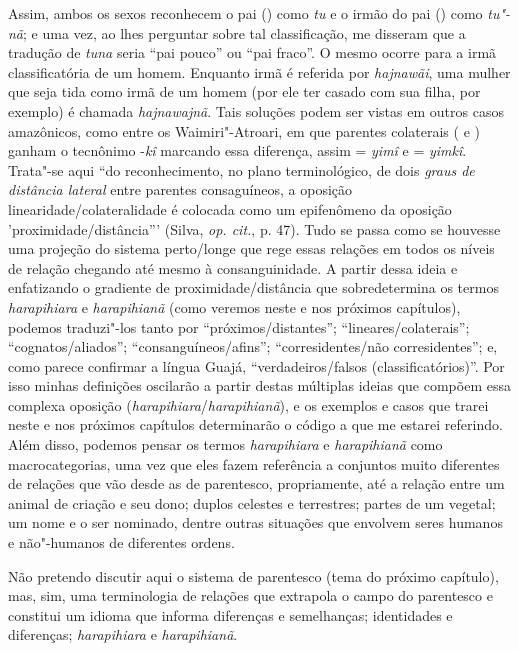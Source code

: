 Assim, ambos os sexos reconhecem o pai () como \emph{tu} e o irmão do
pai () como \emph{tu"-nã}; e uma vez, ao lhes perguntar sobre tal
classificação, me disseram que a tradução de \emph{tuna} seria ``pai
pouco'' ou ``pai fraco''. O mesmo ocorre para a irmã classificatória de um
homem. Enquanto irmã é referida por \emph{hajnawãi}, uma mulher que seja
tida como irmã de um homem (por ele ter casado com sua filha, por
exemplo) é chamada \emph{hajnawajnã}. Tais soluções podem ser vistas em
outros casos amazônicos, como entre os Waimiri"-Atroari, em que parentes
colaterais ( e ) ganham o tecnônimo -\emph{kî} marcando essa
diferença, assim  = \emph{yimî} e  = \emph{yimkî}. Trata"-se aqui ``do
reconhecimento, no plano terminológico, de dois \emph{graus de distância
lateral} entre parentes consaguíneos, a oposição
linearidade/colateralidade é colocada como um epifenômeno da oposição
'proximidade/distância''' (Silva, \emph{op. cit.}, p. 47). Tudo se passa como se
houvesse uma projeção do sistema perto/longe que rege essas relações em
todos os níveis de relação chegando até mesmo à consanguinidade. A
partir dessa ideia e enfatizando o gradiente de proximidade/distância
que sobredetermina os termos \emph{harapihiara} e \emph{harapihianã}
(como veremos neste e nos próximos capítulos), podemos traduzi"-los tanto
por ``próximos/distantes''; ``lineares/colaterais''; ``cognatos/aliados'';
``consanguíneos/afins''; ``corresidentes/não corresidentes''; e, como parece
confirmar a língua Guajá, ``verdadeiros/falsos (classificatórios)''. Por
isso minhas definições oscilarão a partir destas múltiplas ideias que
compõem essa complexa oposição (\emph{harapihiara}/\emph{harapihianã}),
e os exemplos e casos que trarei neste e nos próximos capítulos
determinarão o código a que me estarei referindo. Além disso, podemos
pensar os termos \emph{harapihiara} e \emph{harapihianã} como
macrocategorias, uma vez que eles fazem referência a conjuntos muito
diferentes de relações que vão desde as de parentesco, propriamente, até
a relação entre um animal de criação e seu dono; duplos celestes e
terrestres; partes de um vegetal; um nome e o ser nominado, dentre
outras situações que envolvem seres humanos e não"-humanos de diferentes
ordens.

Não pretendo discutir aqui o sistema de parentesco (tema do próximo
capítulo), mas, sim, uma terminologia de relações que extrapola o campo
do parentesco e constitui um idioma que informa diferenças e
semelhanças; identidades e diferenças; \emph{harapihiara} e
\emph{harapihianã}.

